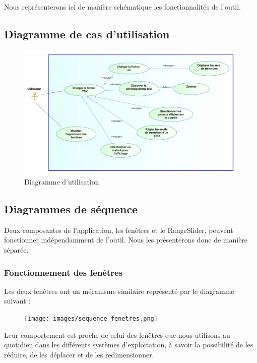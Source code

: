 Nous représenterons ici de manière schématique les fonctionnalités de l’outil.

\bigbreak

\subsection{Diagramme de cas d’utilisation}

\begin{figure}[!h]
    \center
    \includegraphics[scale = .65]{images/utilisation.png}
   \caption{Diagramme d'utilisation}
 \end{figure}

\bigbreak

\subsection{Diagrammes de séquence}
\bigbreak
Deux composantes de l’application, les fenêtres et le RangeSlider, peuvent fonctionner indépendamment de l’outil. Nous les présenterons donc de manière séparée.
\bigbreak
\newpage
\subsubsection{Fonctionnement des fenêtres}
\bigbreak
Les deux fenêtres ont un mécanisme similaire représenté par le diagramme suivant :
\begin{figure}[!h]
  \bigbreak
  \centering
  \texttt{[image: images/sequence\_fenetres.png]}
\end{figure}

Leur comportement est proche de celui des fenêtres que nous utilisons au quotidien dans les différents systèmes d’exploitation, à savoir la possibilité de les réduire, de les déplacer et de les redimensionner.


